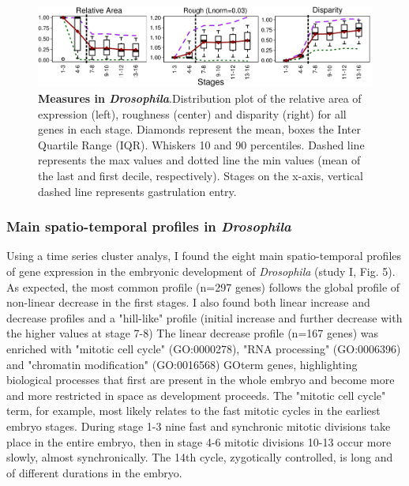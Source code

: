 \begin{figure}[b]
  \includegraphics[width=\textwidth]{./Images/Art-I/3_measures.png}
  \centering
  \caption{\textbf{Measures in \textit{Drosophila}}.Distribution plot of the relative area of expression (left), roughness (center) and disparity (right) for all genes in each stage. Diamonds represent the mean, boxes the Inter Quartile Range (IQR). Whiskers 10 and 90 percentiles. Dashed line represents the max values and dotted line the min values (mean of the last and first decile, respectively). Stages on the x-axis, vertical dashed line represents gastrulation entry.
  }
  \label{fig:Art-I-3measures}
\end{figure}

\subsubsection{Main spatio-temporal profiles in \textit{Drosophila}}
Using a time series cluster analys, I found the eight main spatio-temporal profiles of gene expression in the embryonic development of \textit{Drosophila} (study I, Fig. 5). As expected, the most common profile (n=297 genes) follows the global profile of non-linear decrease in the first stages.
%
I also found both linear increase and decrease profiles and a "hill-like" profile (initial increase and further decrease with the higher values at stage 7-8)
%
The linear decrease profile (n=167 genes) was enriched with "mitotic cell cycle" (GO:0000278), "RNA processing" (GO:0006396) and "chromatin modification" (GO:0016568) GOterm genes, highlighting biological processes that first are present in the whole embryo and become more and more restricted in space as development proceeds.
The "mitotic cell cycle" term, for example, most likely relates to the fast mitotic cycles in the earliest embryo stages. During stage 1-3 nine fast and synchronic mitotic divisions take place in the entire embryo, then in stage 4-6 mitotic divisions 10-13 occur more slowly, almost synchronically. The 14th cycle, zygotically controlled, is long and of different durations in the embryo.

